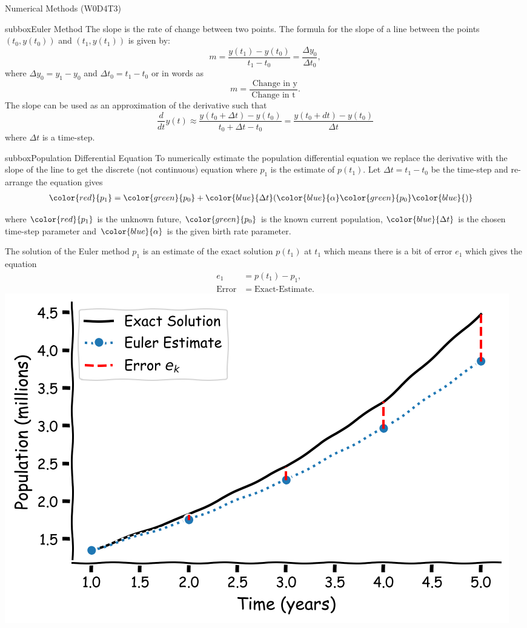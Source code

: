 \begin{multicols}{3}
\begin{textbox}{Numerical Methods (W0D4T3) }
\begin{subbox}{subbox}{Euler Method}
The slope is the rate of change between two points. The formula for the slope of a line between the points $(t_0,y(t_0))$ and $(t_1,y(t_1))$ is given by:
$$ m=\frac{y(t_1)-y(t_0)}{t_1-t_0}=\frac{\Delta y_0}{\Delta t_0}, $$
where $\Delta y_0=y_1-y_0$ and $\Delta t_0=t_1-t_0$ or in words as
$$ m=\frac{\text{ Change in y} }{\text{Change in t}}. $$
The slope can be used as an approximation of the derivative such that
$$ \frac{d}{dt}y(t)\approx \frac{y(t_0+\Delta t)-y(t_0)}{t_0+\Delta t-t_0}=\frac{y(t_0+dt)-y(t_0)}{\Delta t}$$
where $\Delta t$ is a time-step.
\end{subbox}
\begin{subbox}{subbox}{Population Differential Equation}
\scriptsize
To numerically estimate the population differential equation we replace the derivative with the slope of the line to get the discrete (not continuous) equation where $p_1$ is the estimate of $p(t_1)$. Let $\Delta t=t_1-t_0$ be the time-step and re-arrange the equation gives
\begin{align*}
\color{red}{p_1}&=\color{green}{p_0}+\color{blue}{\Delta t} (\color{blue}{\alpha} \color{green}{p_0} \color{blue}{)}
\end{align*}

where $\color{red}{p_1}$ is the unknown future, $\color{green}{p_0}$ is the known current population, $\color{blue}{\Delta t}$ is the chosen time-step parameter and $\color{blue}{\alpha}$ is the given birth rate parameter.

The solution of the Euler method $p_1$ is an estimate of the exact solution $p(t_1)$ at $t_1$ which means there is a bit of error $e_1$ which gives the equation
\begin{align*}
e_1&=p(t_1)-p_1,\\
\text{Error}&=\text{Exact-Estimate}.
\end{align*}
\centering
\includegraphics[scale=0.12]{Figures/PreCourse/CFigure7.png}
\end{subbox}


\end{textbox}
\end{multicols}
